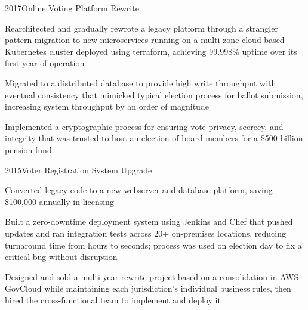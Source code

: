 \project
  {2017}{Online Voting Platform Rewrite}
  {\begin{achievements}
    \item Rearchitected and gradually rewrote a legacy platform through a strangler pattern migration to new microservices running on a multi-zone cloud-based Kubernetes cluster deployed using terraform, achieving 99.998\% uptime over its first year of operation
    \item Migrated to a distributed database to provide high write throughput with eventual consistency that mimicked typical election process for ballot submission, increasing system throughput by an order of magnitude
    \item Implemented a cryptographic process for ensuring vote privacy, secrecy, and integrity that was trusted to host an election of board members for a \$500 billion pension fund
   \end{achievements}}

\project
  {2015}{Voter Registration System Upgrade}
  {\begin{achievements}
    \item Converted legacy code to a new webserver and database platform, saving \$100,000 annually in licensing
    \item Built a zero-downtime deployment system using Jenkins and Chef that pushed updates and ran integration tests across 20+ on-premises locations, reducing turnaround time from hours to seconds; process was used on election day to fix a critical bug without disruption
    \item Designed and sold a multi-year rewrite project based on a consolidation in AWS GovCloud while maintaining each jurisdiction's individual business rules, then hired the cross-functional team to implement and deploy it
  \end{achievements}}
